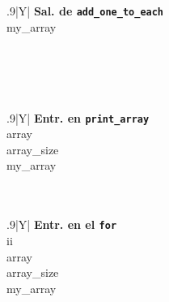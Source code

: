\documentclass[a4paper]{article}
\begin{document}
\begin{table}[H]
    \begin{subfigure}{0.33333\linewidth}
        \centering
        \begin{tabularx}{.9\linewidth}{|Y|}
        \hline
        \textbf{Sal. de \texttt{add\_one\_to\_each}} \\\hline
        my\_array\\\hline
        \\ \hline
        \\ \hline
        \\ \hline
        \\ \hline
        \end{tabularx}
    \end{subfigure}%
    \begin{subfigure}{0.33333\linewidth}
        \centering
        \begin{tabularx}{.9\linewidth}{|Y|}
        \hline
        \textbf{Entr. en \texttt{print\_array}}\\\hline
        array\\\hline
        array\_size\\\hline
        my\_array\\\hline
        \\ \hline
        \\ \hline
        \end{tabularx}
    \end{subfigure}%
    \begin{subfigure}{0.33333\linewidth}
        \centering
        \begin{tabularx}{.9\linewidth}{|Y|}
        \hline
        \textbf{Entr. en el \texttt{for}}\\\hline
        ii \\\hline
        array\\\hline
        array\_size\\\hline
        my\_array\\\hline
        \\ \hline
        \end{tabularx}
    \end{subfigure}%



\end{table}
\end{document}
